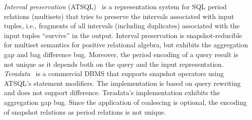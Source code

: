 \emph{Interval preservation} (ATSQL)~\cite[Def.\ 2.10]{BohlenJS00} is a
representation system for SQL period relations (multisets) that tries to
preserve
the intervals associated with input
tuples, i.e., fragments of all intervals (including duplicates)
associated with the input tuples ``survive'' in the output.  Interval
preservation is snapshot-reducible for multiset semantics for positive
relational algebra, but exhibits the aggregation gap and bag difference
bug.  Moreover, the period encoding of a query result is not unique as
it depends both on the query and the input representation.
%
\emph{Teradata}~\cite{teradata1510} is a commercial DBMS that supports
snapshot operators using ATSQL's statement modifiers. The
implementation is based on query
rewriting~\cite{DBLP:conf/edbt/Al-KatebGCBCP13} and does not support
difference.  Teradata's implementation exhibits the aggregation gap
bug. Since the application of coalescing is optional, the encoding of
snapshot relations as period relations is not unique.
%
